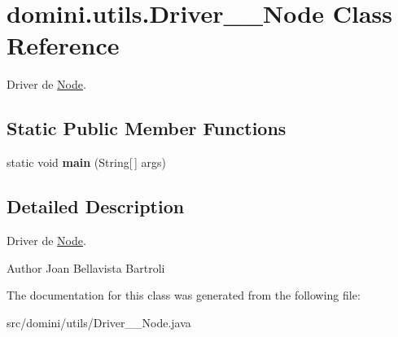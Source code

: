 \hypertarget{classdomini_1_1utils_1_1Driver____Node}{}\section{domini.\+utils.\+Driver\+\_\+\+\_\+\+Node Class Reference}
\label{classdomini_1_1utils_1_1Driver____Node}


Driver de \hyperlink{classdomini_1_1utils_1_1Node}{Node}.  


\subsection*{Static Public Member Functions}
\begin{DoxyCompactItemize}
\item 
\mbox{\label{classdomini_1_1utils_1_1Driver____Node_abfb5f35b8100dec9d147a79af04df017}} 
static void {\bfseries main} (String\mbox{[}$\,$\mbox{]} args)
\end{DoxyCompactItemize}


\subsection{Detailed Description}
Driver de \hyperlink{classdomini_1_1utils_1_1Node}{Node}. 

\begin{DoxyAuthor}{Author}
Joan Bellavista Bartroli 
\end{DoxyAuthor}


The documentation for this class was generated from the following file\+:\begin{DoxyCompactItemize}
\item 
src/domini/utils/Driver\+\_\+\+\_\+\+Node.\+java\end{DoxyCompactItemize}

